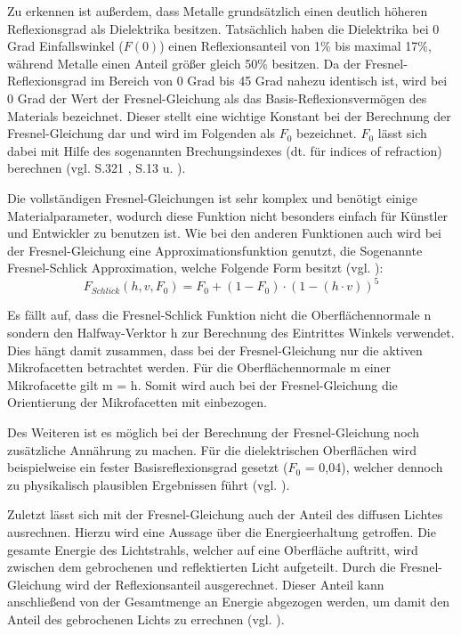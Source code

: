 \documentclass[
  11pt,
  a4paper,
  oneside
  ]{article}
\begin{document}
Zu erkennen ist außerdem, dass Metalle grundsätzlich einen deutlich höheren Reflexionsgrad als Dielektrika besitzen. Tatsächlich haben die Dielektrika bei 0 Grad Einfallswinkel ($F(0)$) einen Reflexionsanteil von 1\% bis maximal 17\%, während Metalle einen Anteil größer gleich 50\% besitzen. Da der Fresnel-Reflexionsgrad im Bereich von 0 Grad bis 45 Grad nahezu identisch ist, wird bei 0 Grad der Wert der Fresnel-Gleichung als das Basis-Reflexionsvermögen des Materials bezeichnet. Dieser stellt eine wichtige Konstant bei der Berechnung der Fresnel-Gleichung dar und wird im Folgenden als $F_{0}$ bezeichnet. $F_{0}$ lässt sich dabei mit Hilfe des sogenannten Brechungsindexes (dt. für indices of refraction) berechnen 
(vgl. S.321 \cite{realTimeRendering4th}, S.13 \cite{rtrPaper} u. \cite{learnOpenGL}).

Die vollständigen Fresnel-Gleichungen ist sehr komplex und benötigt einige Materialparameter, wodurch diese Funktion nicht besonders einfach für Künstler und Entwickler zu benutzen ist. Wie bei den anderen Funktionen auch wird bei der Fresnel-Gleichung eine Approximationsfunktion genutzt, die Sogenannte Fresnel-Schlick Approximation, welche Folgende Form besitzt (vgl. \cite{learnOpenGL}): 
\begin{equation}
  F_{Schlick}\left( h,v,F_{0}\right) =F_{0}+\left( 1-F_{0}\right) \cdot \left( 1-\left( h\cdot v\right) \right) ^{5}
\end{equation}

Es fällt auf, dass die Fresnel-Schlick Funktion nicht die Oberflächennormale n sondern den Halfway-Verktor h zur Berechnung des Eintrittes Winkels verwendet. Dies hängt damit zusammen, dass bei der Fresnel-Gleichung nur die aktiven Mikrofacetten betrachtet werden. Für die Oberflächennormale m einer Mikrofacette gilt m = h. Somit wird auch bei der Fresnel-Gleichung die Orientierung der Mikrofacetten mit einbezogen. 

Des Weiteren ist es möglich bei der Berechnung der Fresnel-Gleichung noch zusätz\-liche Annährung zu machen. Für die dielektrischen Oberflächen wird beispielweise ein fester Basisreflexionsgrad gesetzt ($F_{0}$ = 0,04), welcher dennoch zu physikalisch plausiblen Ergebnissen führt (vgl. \cite{learnOpenGL}).

Zuletzt lässt sich mit der Fresnel-Gleichung auch der Anteil des diffusen Lichtes ausrechnen. Hierzu wird eine Aussage über die Energieerhaltung getroffen. Die gesamte Energie des Lichtstrahls, welcher auf eine Oberfläche auftritt, wird zwischen dem gebrochenen und reflektierten Licht aufgeteilt. Durch die Fresnel-Gleichung wird der Reflexionsanteil ausgerechnet. Dieser Anteil kann anschließend von der Gesamtmenge an Energie abgezogen werden, um damit den Anteil des gebrochenen Lichts zu errechnen (vgl. \cite{learnOpenGL}).
\end{document}

